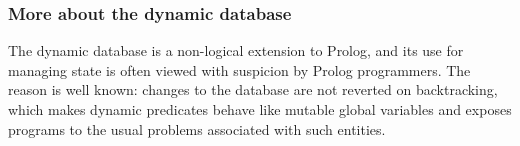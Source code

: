 %
%
%
%
%
%
%

\subsubsection{More about the dynamic database}\label{sec:dynamic-database}

The dynamic database is a non-logical extension to Prolog, and its use for managing state is often viewed with suspicion by Prolog programmers. The reason is well known: changes to the database are not reverted on backtracking, which makes dynamic predicates behave like mutable global variables and exposes programs to the usual problems associated with such entities.

